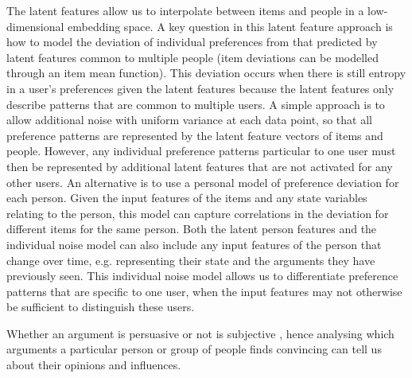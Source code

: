 The latent features allow us to interpolate between items and people in a low-dimensional embedding space. 
A key question in this latent feature approach is how to model the deviation of individual 
preferences from that predicted by latent features common to multiple people (item deviations
can be modelled through an item mean function).
This deviation occurs when there is still entropy in a user's preferences given the latent features
because the latent features only describe patterns that are common to multiple users.
A simple approach is to allow additional noise with uniform variance at each data point, 
so that all preference patterns are represented by the latent feature vectors of items and people.
However, any individual preference patterns particular to one user must then be represented by additional
latent features that are not activated for any other users. 
An alternative is to use a personal model of preference deviation for each person. 
Given the input features of the items and any state variables relating to the person, 
this model can capture correlations in the deviation for different items for the same person. 
Both the latent person features and the individual noise model can also include any input features of 
the person that change over time, e.g. representing their state and the arguments they have 
previously seen. 
This individual noise model allows us to differentiate preference patterns that are specific to 
one user, when the input features may not otherwise be sufficient to distinguish these users. 

Whether an argument is persuasive or not is subjective \cite{lukin2017argument},
hence analysing which arguments a particular person or group of people finds convincing can tell us
about their opinions and influences.
